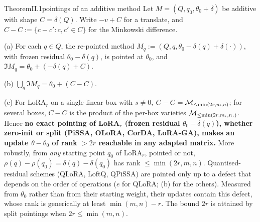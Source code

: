 \begin{restate}{Theorem}{II.1}{pointings of an additive method}
Let $M=(Q,q_0,\theta_0+\delta)$ be additive with shape $C=\delta(Q)$. Write $-v+C$ for a translate, and
$C-C:=\{c-c':c,c'\in C\}$ for the Minkowski difference.

(a) For each $q\in Q$, the re-pointed method $M_q:=(Q,q,\theta_0-\delta(q)+\delta(\cdot))$, with frozen residual
$\theta_0-\delta(q)$, is pointed at $\theta_0$, and $\Im M_q=\theta_0+(-\delta(q)+C)$.

(b) $\bigcup_q\Im M_q=\theta_0+(C-C)$.

(c) For LoRA$_r$ on a single linear box with $s\ne0$, $C-C=\mathcal{M}_{\le\min(2r,m,n)}$; for several boxes, $C-C$ is the
product of the per-box varieties $\mathcal{M}_{\le\min(2r,m_i,n_i)}$. Hence \textbf{no exact pointing of LoRA$_r$ (frozen
residual $\theta_0-\delta(q)$), whether zero-init or split (PiSSA, OLoRA, CorDA, LoRA-GA), makes an update
$\theta-\theta_0$ of rank $>2r$ reachable in any adapted matrix.} More robustly, from \emph{any} starting point $q_0$ of
LoRA$_r$, pointed or not, $\rho(q)-\rho(q_0)=\delta(q)-\delta(q_0)$ has rank $\le\min(2r,m,n)$. Quantised-residual
schemes (QLoRA, LoftQ, QPiSSA) are pointed only up to a defect that depends on the order of operations ($e$ for QLoRA;
(b) for the others). Measured from $\theta_0$ rather than from their starting weight, their
updates contain this defect, whose rank is generically at least $\min(m,n)-r$. The bound $2r$ is attained by split
pointings when $2r\le\min(m,n)$.
\end{restate}

